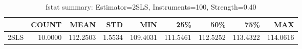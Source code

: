 \begin{table}[ht]
\centering
\caption{fstat summary: Estimator=2SLS, Instruments=100, Strength=0.40}
\begin{tabular}{lrrrrrrrr}
\toprule
 & COUNT & MEAN & STD & MIN & 25\% & 50\% & 75\% & MAX \\
\midrule
2SLS & 10.0000 & 112.2503 & 1.5534 & 109.4031 & 111.5461 & 112.5252 & 113.4322 & 114.0616 \\
\bottomrule
\end{tabular}
\end{table}
